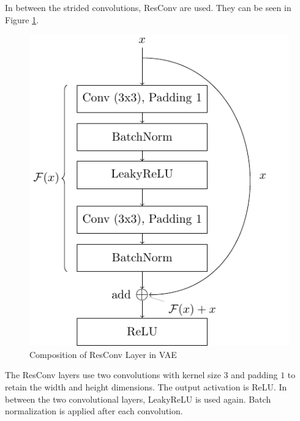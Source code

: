 In between the strided convolutions, \gls{ResConv} \parencite{ResNet} are used.
They can be seen in Figure \ref{fig:resconv}.
\begin{figure}[htb]
    \centering
    \includegraphics[]{figures/model_architecture/build/residual_conv_layer.pdf}
    \caption{Composition of ResConv Layer in VAE \parencite{ResNet}}
    \label{fig:resconv}
\end{figure}
The \gls{ResConv} layers use two convolutions with kernel size $3$ and padding $1$ to retain the width and height dimensions.
The output activation is ReLU.
In between the two convolutional layers, LeakyReLU is used again.
Batch normalization is applied after each convolution.

